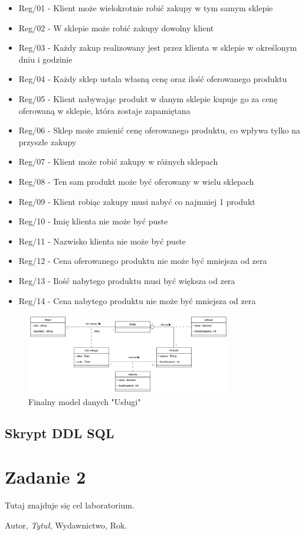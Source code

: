 \documentclass[a4paper,12pt]{article}
\begin{document}
\begin{itemize}
    \item Reg/01 - Klient może wielokrotnie robić zakupy w tym samym sklepie
    \item Reg/02 - W sklepie może robić zakupy dowolny klient
    \item Reg/03 - Każdy zakup realizowany jest przez klienta w sklepie w określonym dniu i godzinie
    \item Reg/04 - Każdy sklep ustala własną cenę oraz ilość oferowanego produktu 
    \item Reg/05 - Klient nabywając produkt w danym sklepie kupuje go za cenę oferowaną w sklepie, która zostaje zapamiętana
    \item Reg/06 - Sklep może zmienić cenę oferowanego produktu, co wpływa tylko na przyszłe zakupy
    \item Reg/07 - Klient może robić zakupy w różnych sklepach
    \item Reg/08 - Ten sam produkt może być oferowany w wielu sklepach
    \item Reg/09 - Klient robiąc zakupy musi nabyć co najmniej 1 produkt
    \item Reg/10 - Imię klienta nie może być puste
    \item Reg/11 - Nazwisko klienta nie może być puste
    \item Reg/12 - Cena oferowanego produktu nie może być mniejsza od zera
    \item Reg/13 - Ilość nabytego produktu musi być większa od zera
    \item Reg/14 - Cena nabytego produktu nie może być mniejsza od zera
\end{itemize}

\begin{figure}[h!]
\centering
\includegraphics[width=0.8\textwidth]{images/improved.png}
\caption{Finalny model danych "Usługi"}
\label{fig:final_model}
\end{figure}

\subsection{Skrypt DDL SQL}

\section{Zadanie 2}
Tutaj znajduje się cel laboratorium.

\begin{thebibliography}{9}
Autor, \textit{Tytuł}, Wydawnictwo, Rok.
\end{thebibliography}
\end{document}
